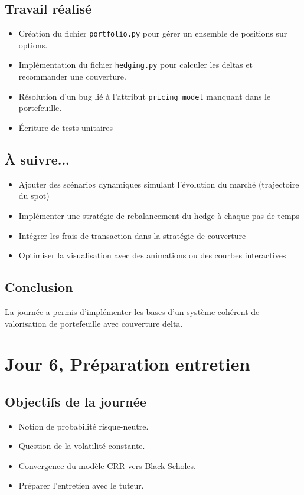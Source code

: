 \documentclass[a4paper,11pt]{article}
\begin{document}
\subsection{Travail réalisé}
\begin{itemize}
    \item Création du fichier \texttt{portfolio.py} pour gérer un ensemble de positions sur options.
    \item Implémentation du fichier \texttt{hedging.py} pour calculer les deltas et recommander une couverture.
    \item Résolution d’un bug lié à l’attribut \texttt{pricing\_model} manquant dans le portefeuille.
    \item Écriture de tests unitaires
\end{itemize}

\subsection{À suivre...}
\begin{itemize}
    \item Ajouter des scénarios dynamiques simulant l’évolution du marché (trajectoire du spot)
    \item Implémenter une stratégie de rebalancement du hedge à chaque pas de temps
    \item Intégrer les frais de transaction dans la stratégie de couverture
    \item Optimiser la visualisation avec des animations ou des courbes interactives
\end{itemize}

\subsection{Conclusion}
La journée a permis d’implémenter les bases d’un système cohérent de valorisation de portefeuille avec couverture delta.

\newpage


\section{Jour 6, Préparation entretien}
\subsection{Objectifs de la journée}
\begin{itemize}
    \item Notion de probabilité risque-neutre.
    \item Question de la volatilité constante.
    \item Convergence du modèle CRR vers Black-Scholes.
    \item Préparer l'entretien avec le tuteur.
\end{itemize}
\end{document}
